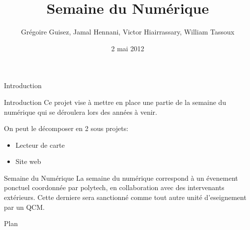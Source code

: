 \documentclass[handout]{beamer}
\title{Semaine du Numérique}
\author[G. Guisez, J. Hennani, V. Hiairrassary, W. Tassoux]{Grégoire Guisez, Jamal Hennani, Victor Hiairrassary, William Tassoux}
\institute{Polytech' Montpellier, Université Montpellier 2}
\date{2 mai 2012}
\begin{document}
\small 



{
    \vfill
    \rlap{\hskip0.1cm\insertlogo}
    \vskip8pt
}


\begin{frame}
    \titlepage
\end{frame}


\begin{frame}{Introduction}
    \begin{block}{Introduction}
 		 Ce projet vise à mettre en place une partie de la semaine du numérique qui se déroulera lors des années à venir.

		 On peut le décomposer en 2 sous projets:
		\begin{itemize}
			\item Lecteur de carte
			\item Site web
		\end{itemize}
	\end{block}

	\begin{block}{Semaine du Numérique}
	    La semaine du numérique correspond à un évenement ponctuel coordonnée 
    par polytech, en collaboration avec des intervenants extérieurs. Cette 
    derniere sera sanctionné comme tout autre unité d'eseignement par un QCM.
	\end{block}	
\end{frame}


\begin{frame}{Plan}
 	\tableofcontents
\end{frame}




\end{document}
